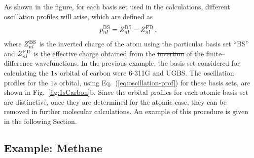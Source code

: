 \documentclass[10pt]{article}
\providecommand{\DIFaddtex}[1]{{\protect\color{blue}\uwave{#1}}} %
\providecommand{\DIFdeltex}[1]{{\protect\color{red}\sout{#1}}}                      %
\providecommand{\DIFaddbegin}{} %
\providecommand{\DIFaddend}{} %
\providecommand{\DIFdelbegin}{} %
\providecommand{\DIFdelend}{} %
\providecommand{\DIFadd}[1]{\texorpdfstring{\DIFaddtex{#1}}{#1}} %
\providecommand{\DIFdel}[1]{\texorpdfstring{\DIFdeltex{#1}}{}} %
\begin{document}
As shown in the figure, for each basis set used in the calculations,
different oscillation profiles will arise, which are defined as 
\begin{equation}
 p_{nl}^{\mbox{\scriptsize BS}} = Z_{nl}^{\mbox{\scriptsize BS}}-
 Z_{nl}^{\mbox{\scriptsize FD}} \,,
 \label{eq:oscillation-prof}
\end{equation}
where $Z_{nl}^{\mbox{\scriptsize BS}}$ is the inverted charge of the atom 
using the particular basis set ``BS'' and 
$Z_{nl}^{\mbox{\scriptsize FD}}$ is the effective charge obtained 
from the \DIFdelbegin \DIFdel{invertion }\DIFdelend \DIFaddbegin \DIFadd{inversion }\DIFaddend of the finite--difference wavefunctions. 
In the previous example, the basis set considered for calculating 
the $1s$ orbital of carbon were \mbox{6-311G} and UGBS. The 
oscillation profiles for the $1s$ orbital, using Eq.~(\ref{eq:oscillation-prof}) 
for these basis sets, are shown in Fig.~\ref{fig:1sCarbon}b. 
Since the orbital profiles for each atomic basis set are distinctive,
once they are determined for the atomic case, they can be removed 
in further molecular calculations. An example of this procedure 
is given in the following Section.

\subsection{Example: Methane}
\label{sec:dimmethane}
\end{document}
